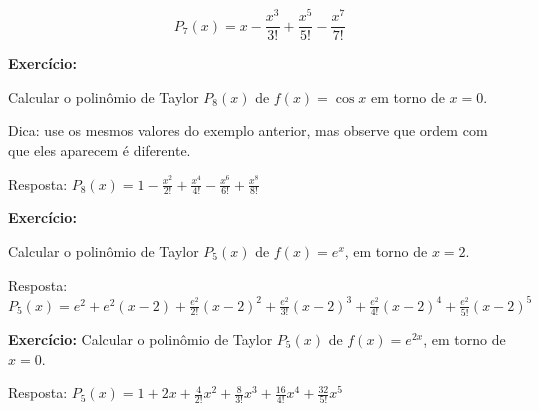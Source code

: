 \documentclass[a4paper]{article}
\begin{document}
\begin{displaymath}
  P_7(x) = x  - \frac{x^3}{3!}  + \frac{x^5}{5!} - \frac{x^7}{7!}
\end{displaymath}

\hrulefill

{\bf Exercício:}

Calcular o polinômio de Taylor $P_8(x)$ de $f(x)=\cos x$ em torno de $x=0$.

Dica: use os mesmos valores do exemplo anterior, mas observe que ordem com que eles aparecem é diferente.

Resposta: $P_8(x) = 1 - \frac{x^2}{2!}  + \frac{x^4}{4!} - \frac{x^6}{6!} + \frac{x^8}{8!}$

\hrulefill

{\bf Exercício:}

Calcular o polinômio de Taylor $P_5(x)$ de $f(x)=e^x$, em torno de $x=2$.

Resposta: $P_5(x) = e^2+ e^2(x-2) + \frac{e^2}{2!}(x-2)^2 + \frac{e^2}{3!}(x-2)^3 + \frac{e^2}{4!}(x-2)^4 + \frac{e^2}{5!}(x-2)^5$

\hrulefill

{\bf Exercício:}
Calcular o polinômio de Taylor $P_5(x)$ de $f(x)=e^{2x}$, em torno de $x=0$.

Resposta: $P_5(x) = 1 + 2x+ \frac{4}{2!}x^2+ \frac{8}{3!}x^3+ \frac{16}{4!}x^4+ \frac{32}{5!}x^5$
\end{document}
